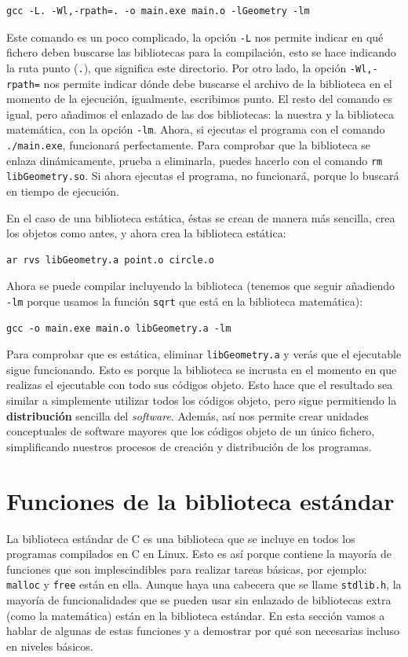\documentclass[a4paper]{article}
\begin{document}
\begin{verbatim}
gcc -L. -Wl,-rpath=. -o main.exe main.o -lGeometry -lm
\end{verbatim}

Este comando es un poco complicado, la opción \verb!-L! nos permite indicar
en qué fichero deben buscarse las bibliotecas para la compilación, esto se hace
indicando la ruta punto (\verb!.!), que significa este directorio. Por otro
lado, la opción \verb!-Wl,-rpath=! nos permite indicar dónde debe buscarse
el archivo de la biblioteca en el momento de la ejecución,
igualmente, escribimos punto. El resto del
comando es igual, pero añadimos el enlazado de las dos bibliotecas: la nuestra y
la biblioteca matemática, con la opción \verb!-lm!. Ahora, si ejecutas el
programa con el comando \verb!./main.exe!, funcionará perfectamente.
Para comprobar que la biblioteca se enlaza dinámicamente, prueba a eliminarla,
puedes hacerlo con el comando \verb!rm libGeometry.so!. Si ahora ejecutas el
programa, no funcionará, porque lo buscará en tiempo de ejecución.

En el caso de una biblioteca estática, éstas se crean de manera más sencilla,
crea los objetos como antes, y ahora crea la biblioteca estática:

\begin{verbatim}
ar rvs libGeometry.a point.o circle.o
\end{verbatim}

Ahora se puede compilar incluyendo la biblioteca (tenemos que seguir añadiendo
\verb!-lm! porque usamos la función \verb!sqrt! que está en la biblioteca
matemática):

\begin{verbatim}
gcc -o main.exe main.o libGeometry.a -lm
\end{verbatim}

Para comprobar que es estática, eliminar \verb!libGeometry.a! y verás que el
ejecutable sigue funcionando. Esto es porque la biblioteca se incrusta en
el momento en que realizas el ejecutable con todo sus códigos objeto. Esto hace
que el resultado sea similar a simplemente utilizar todos los códigos objeto,
pero sigue permitiendo la \textbf{distribución} sencilla del \emph{software}.
Además, así nos permite crear unidades conceptuales de software mayores que
los códigos objeto de un único fichero, simplificando nuestros procesos de
creación y distribución de los programas.


\section{Funciones de la biblioteca estándar}
La biblioteca estándar de C es una biblioteca que se incluye en todos los
programas compilados en C en Linux. Esto es así porque contiene la mayoría
de funciones que son implescindibles para realizar tareas básicas, por ejemplo:
\verb!malloc! y \verb!free! están en ella. Aunque haya una cabecera que se llame
\verb!stdlib.h!, la mayoría de funcionalidades que se pueden usar sin enlazado
de bibliotecas extra (como la matemática) están en la biblioteca estándar.
En esta sección vamos a hablar de algunas de estas funciones y a demostrar por
qué son necesarias incluso en niveles básicos.
\end{document}
